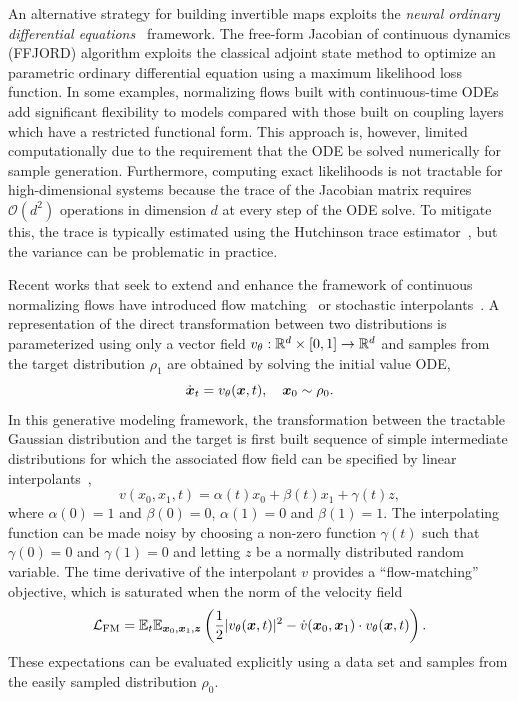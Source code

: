 \documentclass[11pt]{article}
\begin{document}
An alternative strategy for building invertible maps exploits the \emph{neural ordinary differential equations}~\cite{chen_neural_2018} framework.
The free-form Jacobian of continuous dynamics (FFJORD) algorithm exploits the classical adjoint state method to optimize an parametric ordinary differential equation using a maximum likelihood loss function. 
In some examples, normalizing flows built with continuous-time ODEs add significant flexibility to models compared with those built on coupling layers which have a restricted functional form.
This approach is, however, limited computationally due to the requirement that the ODE be solved numerically for sample generation. 
Furthermore, computing exact likelihoods is not tractable for high-dimensional systems because the trace of the Jacobian matrix requires $\mathcal{O}(d^2)$ operations in dimension $d$ at every step of the ODE solve.
To mitigate this, the trace is typically estimated using the Hutchinson trace estimator~\cite{hutchinson_stochastic_1989}, but the variance can be problematic in practice. 

Recent works that seek to extend and enhance the framework of continuous normalizing flows have introduced flow matching~\cite{peluchetti_non-denoising_2022,peluchetti_diffusion_2023,lipman_flow_2022} or stochastic interpolants~\cite{albergo_building_2022, albergo_stochastic_2023}.
A representation of the direct transformation between two distributions is parameterized using only a vector field $v_{\theta}: \mathbb{R}^d\times[0,1]\to \mathbb{R}^d$ and samples from the target distribution $\rho_1$ are obtained by solving the initial value ODE,
\begin{equation}
    \dot {\boldsymbol{x}}_t = v_{\theta}(\boldsymbol{x},t), \quad \boldsymbol{x}_0 \sim \rho_0.
\end{equation}
In this generative modeling framework, the transformation between the tractable Gaussian distribution and the target is first built sequence of simple intermediate distributions for which the associated flow field can be specified by linear interpolants~\cite{lipman_flow_2022, albergo_building_2022}, 
\begin{equation}
    v(x_0, x_1, t) = \alpha(t) x_0 + \beta(t) x_1 + \gamma(t) z,
\end{equation}
where $\alpha(0)=1$ and $\beta(0)=0$, $\alpha(1)=0$ and $\beta(1)=1$.
The interpolating function can be made noisy by choosing a non-zero function $\gamma(t)$ such that $\gamma(0)=0$ and $\gamma(1)=0$ and letting $z$ be a normally distributed random variable.
The time derivative of the interpolant $v$ provides a ``flow-matching'' objective, which is saturated when the norm of the velocity field 
\begin{equation}
    \mathcal{L}_{\rm FM} = \mathbb{E}_{t} \mathbb{E}_{\boldsymbol{x}_0, \boldsymbol{x}_1, \boldsymbol{z}} \left( \frac12 |v_\theta(\boldsymbol{x}, t)|^2 - \dot v(\boldsymbol{x}_0, \boldsymbol{x}_1) \cdot v_{\theta}(\boldsymbol{x}, t) \right).
\end{equation}
These expectations can be evaluated explicitly using a data set and samples from the easily sampled distribution $\rho_0$.
\end{document}
